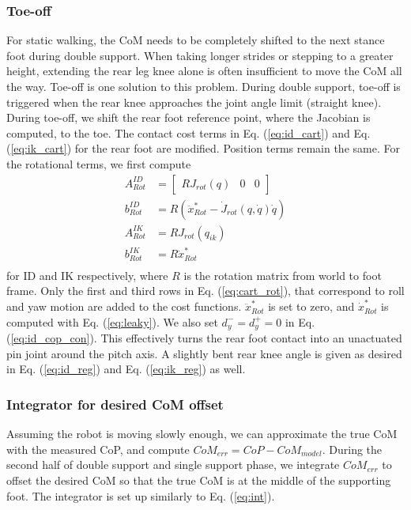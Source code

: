 \documentclass{ws-ijhr}
\newcommand{\eref}[1] {Eq. (\ref{#1})}
\begin{document}
\subsubsection{Toe-off}
For static walking, the CoM needs to be completely shifted to the next stance foot 
during double support. When taking longer strides or stepping to a greater height,
extending the 
rear leg knee alone is often insufficient to move the CoM all the way. Toe-off 
is one solution to this problem. During double support, 
toe-off is triggered when the rear knee approaches the joint angle limit 
(straight knee). 
During toe-off, we shift the rear foot reference point, where the Jacobian is 
computed, to the toe. The contact cost terms in \eref{eq:id_cart} and \eref{eq:ik_cart} for the 
rear foot are modified. Position terms remain the same. For the rotational terms,
we first compute
\begin{equation}
  \begin{split}
    A^{ID}_{Rot} &= \begin{bmatrix} R J_{rot}(q) & 0 & 0 \end{bmatrix} \\
		b^{ID}_{Rot} &= R (\ddot{x}^*_{Rot} - \dot{J}_{rot}(q,\dot{q}) \dot{q}) \\
    A^{IK}_{Rot} &= R J_{rot}(q_{ik}) \\
    b^{IK}_{Rot} &= R \dot{x}^*_{Rot} \\
  \end{split}
	\label{eq:cart_rot}
\end{equation}   
for ID and IK respectively, where $R$ is the rotation matrix from world to foot 
frame. Only the first and third rows in \eref{eq:cart_rot}, that correspond to 
roll and yaw motion are added to the cost functions. $\ddot{x}^*_{Rot}$ is set to zero, 
and $\dot{x}^*_{Rot}$ is computed with \eref{eq:leaky}.
We also set $d^-_y = d^+_y = 0$ in \eref{eq:id_cop_con}. 
This effectively turns the rear foot contact into an unactuated pin joint 
around the pitch axis. A slightly bent rear knee angle is given as desired in 
\eref{eq:id_reg} and \eref{eq:ik_reg} as well.

\subsubsection{Integrator for desired CoM offset}
\label{sec:com_int}
Assuming the robot is moving slowly enough, we can approximate the true CoM 
with the measured CoP, and compute $CoM_{err} = CoP - CoM_{model}$.
During the second half of double support and single support phase, 
we integrate $CoM_{err}$ to offset the desired CoM so that the true CoM is at 
the middle of the supporting foot. 
The integrator is set up similarly to \eref{eq:int}. 
\end{document}
